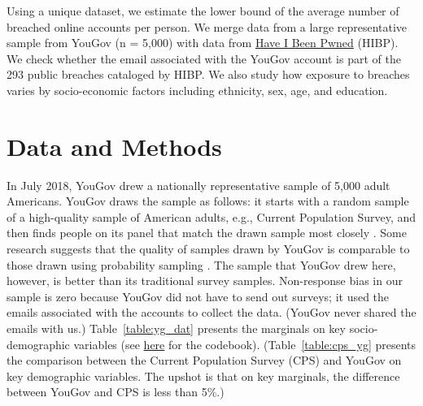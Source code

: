 \documentclass[sigconf]{acmart}
\begin{document}
Using a unique dataset, we estimate the lower bound of the average number of breached online accounts per person. We merge data from a large representative sample from YouGov (n = 5,000) with data from \href{https://haveibeenpwned.com}{Have I Been Pwned} (HIBP). We check whether the email associated with the YouGov account is part of the 293 public breaches cataloged by HIBP. We also study how exposure to breaches varies by socio-economic factors including ethnicity, sex, age, and education.

\section{Data and Methods}
In July 2018, YouGov drew a nationally representative sample of 5,000 adult Americans. YouGov draws the sample as follows: it starts with a random sample of a high-quality sample of American adults, e.g., Current Population Survey, and then finds people on its panel that match the drawn sample most closely \cite{rivers}. Some research suggests that the quality of samples drawn by YouGov is comparable to those drawn using probability sampling \cite{ansolabehere}. The sample that YouGov drew here, however, is better than its traditional survey samples. Non-response bias in our sample is zero because YouGov did not have to send out surveys; it used the emails associated with the accounts to collect the data. (YouGov never shared the emails with us.) Table~\ref{table:yg_dat} presents the marginals on key socio-demographic variables (see \href{https://github.com/themains/pwned/tree/master/data}{here} for the codebook). (Table~\ref{table:cps_yg} presents the comparison between the Current Population Survey (CPS) and YouGov on key demographic variables. The upshot is that on key marginals, the difference between YouGov and CPS is less than 5\%.)
\end{document}
